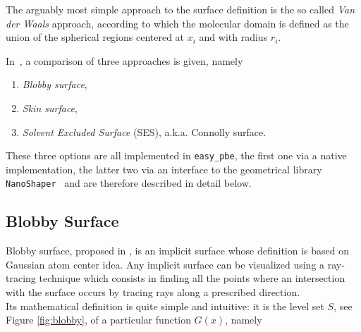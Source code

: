 \documentclass[11pt,a4paper]{article}
\begin{document}
The arguably most simple approach to the surface definition is the so called 
\emph{Van der Waals} approach, according to which the molecular domain
is defined as the union of the spherical regions centered at $x_i$ and 
with radius $r_i$.

In~\cite{ref8}, a comparison of three approaches is given, namely
\begin{enumerate}
    \item \emph{Blobby surface},
    \item \emph{Skin surface},
    \item \emph{Solvent Excluded Surface} (SES), a.k.a. Connolly surface.
\end{enumerate}

These  three options are all implemented in {\tt easy\_pbe}, the first one via a
native implementation, the latter two via an interface to the geometrical library
{\tt NanoShaper}~\cite{RDCNS} and are therefore described in detail below.


\subsection{Blobby Surface}
\label{sec:blobby}
Blobby surface, proposed in \cite{blobby1, blobby2}, is an implicit surface whose definition is based on Gaussian atom center idea. Any implicit surface can be visualized using a ray-tracing technique which consists in finding  all the points where an intersection with the surface occurs by tracing rays along a prescribed direction. \\ 
Its mathematical definition is quite simple and intuitive: it is the level set $S$, see Figure \ref{fig:blobby}, of a particular function $G(x)$, namely
\end{document}
